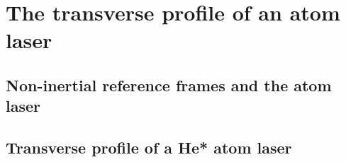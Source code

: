 \chapter{The transverse profile of an atom laser}
\label{TransverseProfile}
\graphicspath{{Figures/TransverseProfile/}{Figures/Common/}}

\section{Non-inertial reference frames and the atom laser}
\label{TransverseProfile:DropGP}

\section{Transverse profile of a He* atom laser}
\label{TransverseProfile:Helium}